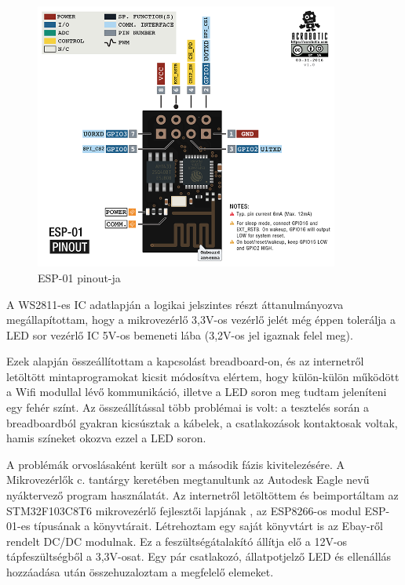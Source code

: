 \documentclass[../main.tex]{subfiles}
\begin{document}
        \begin{figure}[h!]
            \centering
                \includegraphics[width=10cm]{resources/pcb_res/esp8266_esp01_pinout.png}
            \caption{ESP-01 pinout-ja}
            \label{fig:eps01_pinout}
        \end{figure}
        
        A WS2811-es IC adatlapján a logikai jelszintes részt áttanulmányozva megállapítottam, hogy a mikrovezérlő 3,3V-os vezérlő jelét még éppen tolerálja a LED sor vezérlő IC 5V-os bemeneti lába (3,2V-os jel igaznak felel meg). 
        
        Ezek alapján összeállítottam a kapcsolást breadboard-on, és az internetről letöltött mintaprogramokat kicsit módosítva elértem, hogy külön-külön működött a Wifi modullal lévő kommunikáció, illetve a LED soron meg tudtam jeleníteni egy fehér színt. Az összeállítással több problémai is volt: a tesztelés során a breadboardból gyakran kicsúsztak a kábelek, a csatlakozások kontaktosak voltak, hamis színeket okozva ezzel a LED soron. 
        
        A problémák orvoslásaként került sor a második fázis kivitelezésére. A Mikrovezérlők c. tantárgy keretében megtanultunk az Autodesk Eagle nevű nyáktervező program használatát. Az internetről letöltöttem és beimportáltam az STM32F103C8T6 mikrovezérlő fejlesztői lapjának
        , az ESP8266-os modul ESP-01-es 
        típusának a könyvtárait. Létrehoztam egy saját könyvtárt is az Ebay-ről rendelt DC/DC modulnak. Ez a feszültségátalakító állítja elő a 12V-os tápfeszültségből a 3,3V-osat. Egy pár csatlakozó, állatpotjelző LED és ellenállás hozzáadása után összehuzaloztam a megfelelő elemeket. 
        
\end{document}
